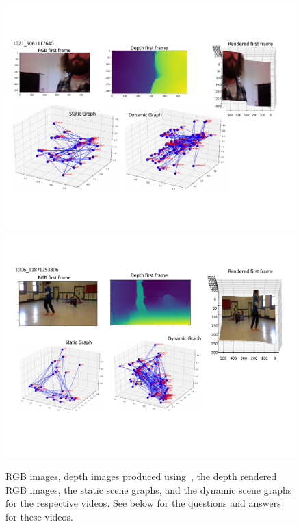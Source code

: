 \documentclass[letterpaper]{article}
\begin{document}
\begin{figure}
    \centering
    \includegraphics[width=16cm,trim={0cm 3cm 0cm 3.0cm},clip]{./figs/sg_quals_1.pdf}
    \vspace*{10pt}
     \includegraphics[width=16cm,trim={0cm 3cm 0cm 3.0cm},clip]{./figs/sg_quals_2.pdf}
    \caption{RGB images, depth images produced using~\cite{ranftl2019towards}, the depth rendered RGB images, the static scene graphs, and the dynamic scene graphs for the respective videos. See below for the questions and answers for these videos.}
    \label{fig:quals_1}
\end{figure}
\end{document}
